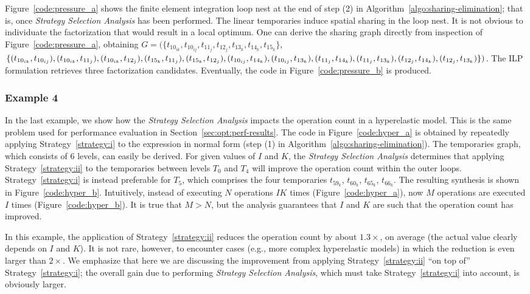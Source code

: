 Figure~\ref{code:pressure_a} shows the finite element integration loop nest at the end of step (2) in Algorithm~\ref{algo:sharing-elimination}; that is, once {\em Strategy Selection Analysis} has been performed. The linear temporaries induce spatial sharing in the loop nest. It is not obvious to individuate the factorization that would result in a local optimum. One can derive the sharing graph directly from inspection of Figure~\ref{code:pressure_a}, obtaining $G = (\lbrace t_{10_{ik}}, t_{10_{ij}}, t_{11_{j}}, t_{12_{j}}, t_{13_{k}}, t_{14_{k}}, t_{15_{k}}\rbrace$, $\lbrace (t_{10_{ik}},t_{10_{ij}}), (t_{10_{ik}},t_{11_{j}}), (t_{10_{ik}},t_{12_{j}}), (t_{15_{k}},t_{11_{j}}), (t_{15_{k}},t_{12_{j}}), (t_{10_{ij}},t_{14_{k}}), (t_{10_{ij}},t_{13_{k}}),\\ (t_{11_{j}},t_{14_{k}}), (t_{11_{j}},t_{13_{k}}), (t_{12_{j}},t_{14_{k}}), (t_{12_{j}},t_{13_{k}}) \rbrace)$. The ILP formulation retrieves three factorization candidates. Eventually, the code in Figure~\ref{code:pressure_b} is produced. 

\subsubsection{Example 4}
In the last example, we show how the {\em Strategy Selection Analysis} impacts the operation count in a hyperelastic model. This is the same problem used for performance evaluation in Section~\ref{sec:opt:perf-results}. The code in Figure~\ref{code:hyper_a} is obtained by repeatedly applying Strategy~\ref{strategy:i} to the expression in normal form (step (1) in Algorithm~\ref{algo:sharing-elimination}). The temporaries graph, which consists of 6 levels, can easily be derived. For given values of $I$ and $K$, the {\em Strategy Selection Analysis} determines that applying Strategy~\ref{strategy:ii} to the temporaries between levels $T_0$ and $T_4$ will improve the operation count within the outer loops. Strategy~\ref{strategy:i} is instead preferable for $T_5$, which comprises the four temporaries $t_{59_k}$, $t_{60_k}$, $t_{65_k}$, $t_{66_k}$. The resulting synthesis is shown in Figure~\ref{code:hyper_b}. Intuitively, instead of executing $N$ operations $I K$ times (Figure~\ref{code:hyper_a}), now $M$ operations are executed $I$ times (Figure~\ref{code:hyper_b}). It is true that $M > N$, but the analysis guarantees that $I$ and $K$ are such that the operation count has improved. 

In this example, the application of Strategy~\ref{strategy:ii} reduces the operation count by about $1.3 \times$, on average (the actual value clearly depends on $I$ and $K$). It is not rare, however, to encounter cases (e.g., more complex hyperelastic models) in which the reduction is even larger than $2 \times$. We emphasize that here we are discussing the improvement from applying Strategy~\ref{strategy:ii} ``on top of'' Strategy~\ref{strategy:i}; the overall gain due to performing {\em Strategy Selection Analysis}, which must take Strategy~\ref{strategy:i} into account, is obviously larger.

